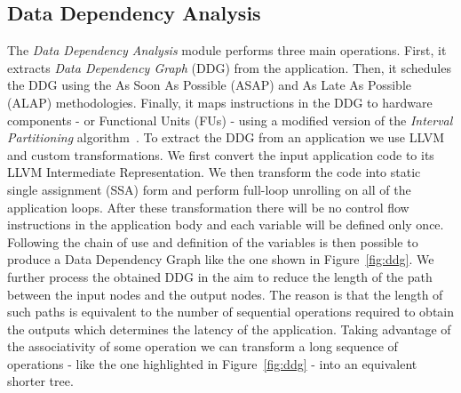 \subsection{Data Dependency Analysis}
The \textit{Data Dependency Analysis} module performs three main operations. First, it extracts \textit{Data Dependency Graph} (DDG) from the application. Then, it schedules the DDG using the As Soon As Possible (ASAP) and As Late As Possible (ALAP) methodologies. Finally, it maps instructions in the DDG to hardware components - or Functional Units (FUs) - using a modified version of the \textit{Interval Partitioning} algorithm~\cite{greedyIntervalPartitioning}.
To extract the DDG from an application we use LLVM  and custom transformations. We first convert the input application code to its LLVM Intermediate Representation. We then transform the code into static single assignment (SSA) form and perform full-loop unrolling on all of the application loops. After these transformation there will be no control flow instructions in the application body and each variable will be defined only once. Following the chain of use and definition of the variables is then possible to produce a Data Dependency Graph like the one shown in Figure~\ref{fig:ddg}. 
We further process the obtained DDG in the aim to reduce the length of the path between the input nodes and the output nodes. The reason is that the length of such paths is equivalent to the number of sequential operations required to obtain the outputs which determines the latency of the application. Taking advantage of the associativity of some operation we can transform a long sequence of operations - like the one highlighted in Figure~\ref{fig:ddg} - into an equivalent shorter tree.

